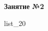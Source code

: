 \documentclass[12pt, a4paper]{article}
\begin{document}
	\begin{center}
		\large
		\textbf{Занятие №2}
	\end{center}
	{list_20}
\end{document}
